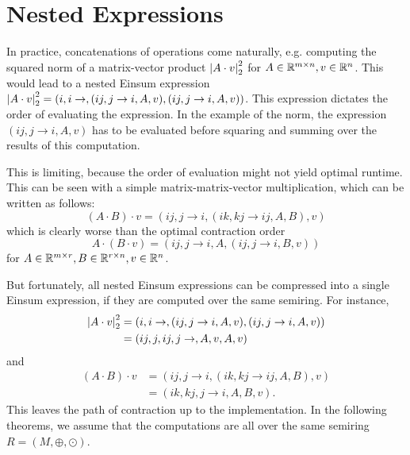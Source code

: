 \chapter{Nested Expressions}
\label{chap:nested}

In practice, concatenations of operations come naturally, e.g. computing the squared norm of a matrix-vector product $\left| A \cdot v \right|_2^2$
for $A \in \mathbb{R}^{m \times n}, v \in \mathbb{R}^n$.
This would lead to a nested Einsum expression $\left| A \cdot v \right|_2^2 = (i,i \rightarrow , (ij, j \rightarrow i, A, v), (ij, j \rightarrow i, A, v))$.
This expression dictates the order of evaluating the expression.
In the example of the norm, the expression $(ij, j \rightarrow i, A, v)$ has to be evaluated before squaring and summing over the results of this computation.

This is limiting, because the order of evaluation might not yield optimal runtime.
This can be seen with a simple matrix-matrix-vector multiplication, which can be written as follows:
$$(A \cdot B) \cdot v = (ij, j \rightarrow i, (ik, kj \rightarrow ij, A, B), v)$$
which is clearly worse than the optimal contraction order
$$A \cdot (B \cdot v) = (ij, j \rightarrow i, A, (ij, j \rightarrow i, B, v))$$
for $A \in \mathbb{R}^{m \times r}, B \in \mathbb{R}^{r \times n}, v \in \mathbb{R}^n$.

But fortunately, all nested Einsum expressions can be compressed into a single Einsum expression, if they are computed over the same semiring.
For instance,
\begin{align*}
    \left| A \cdot v \right|_2^2 & = (i,i \rightarrow , (ij, j \rightarrow i, A, v), (ij, j \rightarrow i, A, v)) \\
                        & = (ij, j, ij, j \rightarrow, A, v, A, v)
\end{align*}
and
\begin{align*}
    (A \cdot B) \cdot v & = (ij, j \rightarrow i, (ik, kj \rightarrow ij, A, B), v) \\
                        & = (ik, kj, j \rightarrow i, A, B, v).
\end{align*}
This leaves the path of contraction up to the implementation.
In the following theorems, we assume that the computations are all over the same semiring $R = (M, \oplus, \odot)$.



